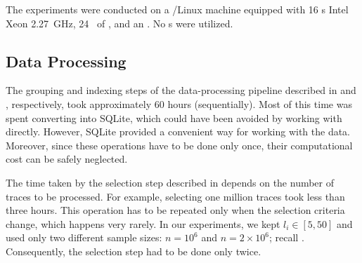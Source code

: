 The experiments were conducted on a /Linux machine equipped with 16
s Intel Xeon  2.27~GHz, 24~ of , and an
. No s were utilized.

\subsection{Data Processing}
The grouping and indexing steps of the data-processing pipeline described in
 and , respectively, took approximately 60 hours
(sequentially). Most of this time was spent converting  into SQLite,
which could have been avoided by working with  directly. However, SQLite
provided a convenient way for working with the data. Moreover, since these
operations have to be done only once, their computational cost can be safely
neglected.

The time taken by the selection step described in  depends on
the number of traces to be processed. For example, selecting one million traces
took less than three hours. This operation has to be repeated only when the
selection criteria change, which happens very rarely. In our experiments, we
kept $l_i \in [5, 50]$ and used only two different sample sizes: $n = 10^6$ and
$n = 2 \times 10^6$; recall . Consequently, the selection step had
to be done only twice.
